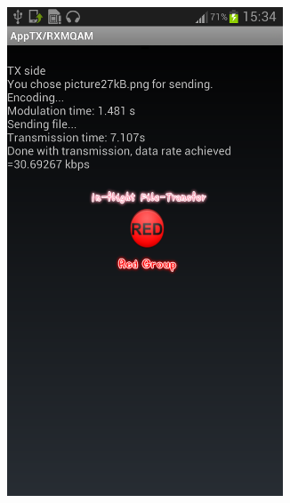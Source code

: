 \documentclass[12pt,a4paper,openright]{report}
\begin{document}
\begin{figure}[H]
 \centering
 \begin{subfigure}{.3\textwidth}
 \centering
    \includegraphics[width=0.9\textwidth]{transmissioncomplete.png}
    \label{fig:appTXside}
    \end{subfigure}%
 \begin{subfigure}{.3\textwidth}
  	 \centering

\end{subfigure}
\end{figure}
\end{document}
